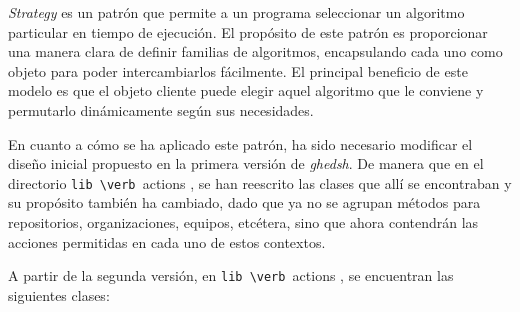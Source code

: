 {\it Strategy} es un patrón que permite a un programa seleccionar un algoritmo particular en tiempo de ejecución. El propósito de este patrón es proporcionar una manera clara 
de definir familias de algoritmos, encapsulando cada uno como objeto para poder intercambiarlos fácilmente. El principal beneficio de este modelo es que el objeto cliente puede elegir aquel algoritmo que le conviene y
permutarlo dinámicamente según sus necesidades.
\bigskip

En cuanto a cómo se ha aplicado este patrón, ha sido necesario modificar el diseño inicial propuesto en la primera versión de {\it ghedsh}.
De manera que en el directorio \verb /lib \verb /actions , se han reescrito las clases que allí se encontraban y su propósito también ha cambiado, dado que ya no se agrupan métodos para repositorios, organizaciones, equipos, etcétera, sino que ahora
contendrán las acciones permitidas en cada uno de estos contextos.
\bigskip

A partir de la segunda versión, en \verb /lib \verb /actions , se encuentran las siguientes clases:
